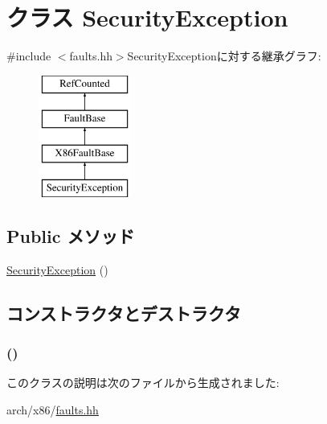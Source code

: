 \hypertarget{classX86ISA_1_1SecurityException}{
\section{クラス SecurityException}
\label{classX86ISA_1_1SecurityException}
}


{\ttfamily \#include $<$faults.hh$>$}SecurityExceptionに対する継承グラフ:\begin{figure}[H]
\begin{center}
\leavevmode
\includegraphics[height=4cm]{classX86ISA_1_1SecurityException}
\end{center}
\end{figure}
\subsection*{Public メソッド}
\begin{DoxyCompactItemize}
\item 
\hyperlink{classX86ISA_1_1SecurityException_a6c61909de0d6bc0cff243456d8790eea}{SecurityException} ()
\end{DoxyCompactItemize}


\subsection{コンストラクタとデストラクタ}
\hypertarget{classX86ISA_1_1SecurityException_a6c61909de0d6bc0cff243456d8790eea}{
\subsubsection[{SecurityException}]{ ()}}
\label{classX86ISA_1_1SecurityException_a6c61909de0d6bc0cff243456d8790eea}



\begin{DoxyCode}
375                             :
376             X86FaultBase("Security Exception", "#SX", 30)
377         {}
    };
\end{DoxyCode}


このクラスの説明は次のファイルから生成されました:\begin{DoxyCompactItemize}
\item 
arch/x86/\hyperlink{arch_2x86_2faults_8hh}{faults.hh}\end{DoxyCompactItemize}
